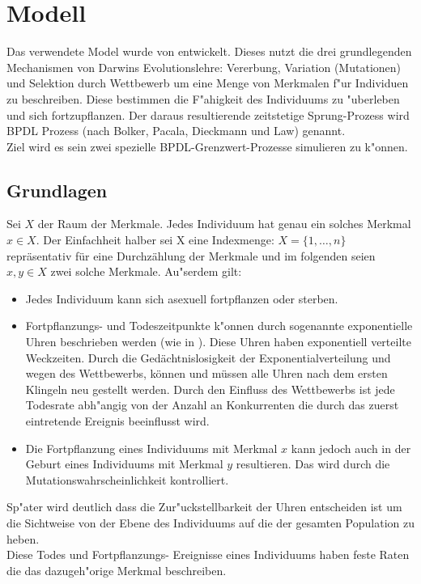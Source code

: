 \documentclass[11pt, a4paper, german]{article}
\begin{document}

\clearpage
\section{Modell}
Das verwendete Model wurde von \cite{Bolker_Spatial_moment,Bolker1997179,raey} entwickelt. Dieses nutzt die drei grundlegenden Mechanismen von Darwins Evolutionslehre: Vererbung, Variation (Mutationen) und Selektion durch Wettbewerb um eine Menge von Merkmalen f"ur Individuen zu beschreiben. Diese bestimmen die F"ahigkeit des Individuums zu "uberleben und sich fortzupflanzen. Der daraus resultierende zeitstetige Sprung-Prozess wird BPDL Prozess (nach Bolker, Pacala, Dieckmann und Law) genannt.\\
Ziel wird es sein zwei spezielle BPDL-Grenzwert-Prozesse simulieren zu k"onnen.
	\subsection{Grundlagen}
	Sei $ X $ der Raum der Merkmale. Jedes Individuum hat genau ein solches Merkmal $ x \in X $. Der Einfachheit halber sei X eine Indexmenge: $ X = \{1,\dots, n\} $ repräsentativ für eine Durchzählung der Merkmale und im folgenden seien $ x,y \in X $ zwei solche Merkmale. Au"serdem gilt:
	\begin{itemize}
		\item Jedes Individuum kann sich asexuell fortpflanzen oder sterben.
		\item Fortpflanzungs- und Todeszeitpunkte k"onnen durch sogenannte exponentielle Uhren beschrieben werden (wie in \cite[S. 3]{fournier2004microscopic}). Diese Uhren haben exponentiell verteilte Weckzeiten. Durch die Gedächtnislosigkeit der Exponentialverteilung und wegen des Wettbewerbs, können und müssen alle Uhren nach dem ersten Klingeln neu gestellt werden. Durch den Einfluss des Wettbewerbs ist jede Todesrate abh"angig von der Anzahl an Konkurrenten die durch das zuerst eintretende Ereignis beeinflusst wird. 
		\item Die Fortpflanzung eines Individuums mit Merkmal $ x $ kann jedoch auch in der Geburt eines Individuums mit Merkmal $ y $ resultieren. Das wird durch die Mutationswahrscheinlichkeit kontrolliert.
	\end{itemize}
	Sp"ater wird deutlich dass die Zur"uckstellbarkeit der Uhren entscheiden ist um die Sichtweise von der Ebene des Individuums auf die der gesamten Population zu heben.\\
	Diese Todes und Fortpflanzungs- Ereignisse eines Individuums haben feste Raten die das dazugeh"orige Merkmal beschreiben.\\
	
\end{document}
